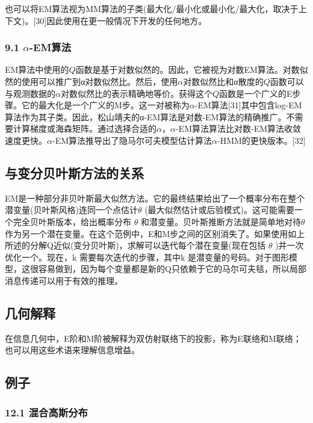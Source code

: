 也可以将EM算法视为MM算法的子类(最大化/最小化或最小化/最大化，取决于上下文)。[30]因此使用在更一般情况下开发的任何地方。

\subsubsection{9.1 $\alpha$-EM算法}

EM算法中使用的$Q$函数是基于对数似然的。因此，它被视为对数EM算法。对数似然的使用可以推广到α对数似然比。然后，使用$\alpha$对数似然比和α散度的$Q$函数可以与观测数据的$\alpha$对数似然比的表示精确地等价。获得这个$Q$函数是一个广义的E步骤。它的最大化是一个广义的M步。这一对被称为$\alpha$-EM算法[31]其中包含log-EM算法作为其子类。因此，松山靖夫的α-EM算法是对数-EM算法的精确推广。不需要计算梯度或海森矩阵。通过选择合适的$\alpha$，$\alpha$-EM算法算法比对数-EM算法收敛速度更快。$\alpha$-EM算法推导出了隐马尔可夫模型估计算法$\alpha$-HMM的更快版本。[32]

\subsection{与变分贝叶斯方法的关系}

EM是一种部分非贝叶斯最大似然方法。它的最终结果给出了一个概率分布在整个潜变量(贝叶斯风格)连同一个点估计$\theta$ (最大似然估计或后验模式)。这可能需要一个完全贝叶斯版本，给出概率分布 $\theta$ 和潜变量。贝叶斯推断方法就是简单地对待$\theta$ 作为另一个潜在变量。在这个范例中，E和M步之间的区别消失了。如果使用如上所述的分解Q近似(变分贝叶斯)，求解可以迭代每个潜在变量(现在包括 $\theta$ )并一次优化一个。现在，k 需要每次迭代的步骤，其中k 是潜变量的号码。对于图形模型，这很容易做到，因为每个变量都是新的Q只依赖于它的马尔可夫毯，所以局部消息传递可以用于有效的推理。

\subsection{几何解释}

在信息几何中，E阶和M阶被解释为双仿射联络下的投影，称为E联络和M联络；也可以用这些术语来理解信息增益。

\subsection{例子}

\subsubsection{12.1 混合高斯分布}

